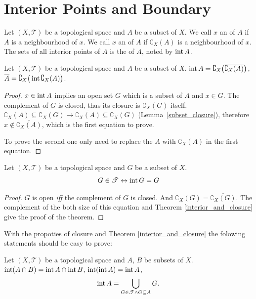 \documentclass[openany]{book}
\begin{document}
\section{Interior Points and Boundary}
\begin{definition}
Let $(X,\mathscr T)$ be a topological space and $A$ be a subset of $X$.
We call $x$ an  of $A$ if $A$ is a neighbourhood of $x$.
We call $x$ an  of $A$ if $\complement_X(A)$ is a neighbourhood of $x$.
The sets of all interior points of $A$ is the  of $A$, noted by $\operatorname{int} A$.
\end{definition}

\begin{theorem}\label{interior_and_closure}
	Let $(X,\mathscr T)$ be a topological space and $A$ be a subset of $X$. 
	$\operatorname{int} A=\complement_X\big(
		\overline{
			\complement_X(A)}\big)$, 
	$\overline A = \complement_X\big(
		\operatorname{int} \complement_X(A)\big)$.
\end{theorem}
\begin{proof}
	$x\in \operatorname{int} A$ implies an open set $G$ which is a subset of $A$ and $x\in G$.
	The complement of $G$ is closed, thus its closure is $\complement_X(G)$ itself. 
	$\complement_X(A)\subseteq \complement_X(G) \rightarrow 
		\overline{\complement_X(A)}\subseteq \complement_X(G)$ (Lemma~\ref{subset_closure}), 
	therefore $x\notin \overline{\complement_X(A)}$, which is the first equation to prove.

	To prove the second one only need to replace the $A$ with $\complement_X(A)$ in the first equation.
\end{proof}

\begin{theorem}
	Let $(X,\mathscr T)$ be a topological space and $G$ be a subset of $X$. 
	\[
		G\in \mathscr T \leftrightarrow
			\operatorname{int} G=G
	\]
\end{theorem}
\begin{proof}
	$G$ is open \emph{iff} the complement of $G$ is closed. And $\complement_X (G) = \overline{\complement_X (G)}$.
	The complement of the both size of this equation and Theorem \ref{interior_and_closure} give the proof of the theorem.
\end{proof}

With the propoties of closure and Theorem \ref{interior_and_closure} the folowing statements should be easy to prove:
\begin{theorem}
Let $(X,\mathscr T)$ be a topological space and $A$, $B$ be subsets of $X$. 
$\operatorname{int} (A\cap B) = \operatorname{int} A \cap \operatorname{int} B$, $\operatorname{int}(\operatorname{int} A) =\operatorname{int} A$,
\[
	\operatorname{int} A = \bigcup\limits_{G\in\mathscr T \wedge G\subseteq A} G.
\]
\end{theorem}
\end{document}
